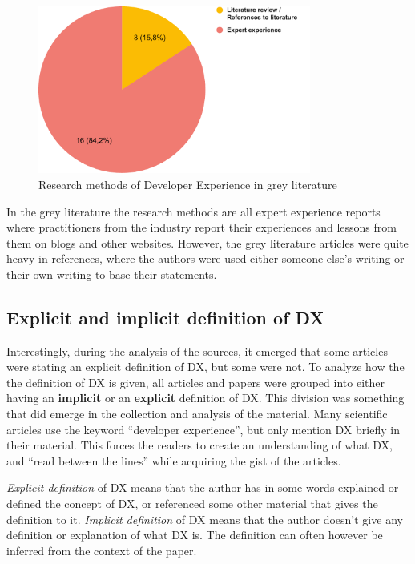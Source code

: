 \documentclass[english, 12pt, a4paper, sci, utf8, a-1b, online]{aaltothesis}
\begin{document}
\begin{figure}[ht]
  \begin{center}
    \includegraphics[width=0.8\textwidth]{research-methods-grey.pdf}
  \end{center}
  \captionsetup{width=0.6\textwidth}
  \caption{Research methods of Developer Experience in grey literature}
\end{figure}


In the grey literature the research methods are all expert experience reports where practitioners from the industry report their experiences and lessons from them on blogs and other websites. However, the grey literature articles were quite heavy in references, where the authors were used either someone else's writing or their own writing to base their statements.

\subsection{Explicit and implicit definition of DX}

Interestingly, during the analysis of the sources, it emerged that some articles were stating an explicit definition of DX, but some were not. To analyze how the the definition of DX is given, all articles and papers were grouped into either having an \textbf{implicit} or an \textbf{explicit} definition of DX. This division was something that did emerge in the collection and analysis of the material. Many scientific articles use the keyword ``developer experience'', but only mention DX briefly in their material. This forces the readers to create an understanding of what DX, and ``read between the lines'' while acquiring the gist of the articles.

\textit{Explicit definition} of DX means that the author has in some words explained or defined the concept of DX, or referenced some other material that gives the definition to it. \textit{Implicit definition} of DX means that the author doesn't give any definition or explanation of what DX is. The definition can often however be inferred from the context of the paper.
\end{document}
